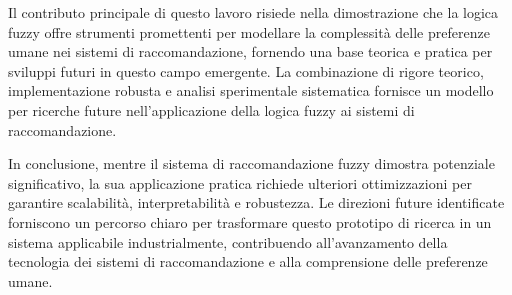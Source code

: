 Il contributo principale di questo lavoro risiede nella dimostrazione che la logica fuzzy offre strumenti promettenti per modellare la complessità delle preferenze umane nei sistemi di raccomandazione, fornendo una base teorica e pratica per sviluppi futuri in questo campo emergente. La combinazione di rigore teorico, implementazione robusta e analisi sperimentale sistematica fornisce un modello per ricerche future nell'applicazione della logica fuzzy ai sistemi di raccomandazione.

In conclusione, mentre il sistema di raccomandazione fuzzy dimostra potenziale significativo, la sua applicazione pratica richiede ulteriori ottimizzazioni per garantire scalabilità, interpretabilità e robustezza. Le direzioni future identificate forniscono un percorso chiaro per trasformare questo prototipo di ricerca in un sistema applicabile industrialmente, contribuendo all'avanzamento della tecnologia dei sistemi di raccomandazione e alla comprensione delle preferenze umane. 